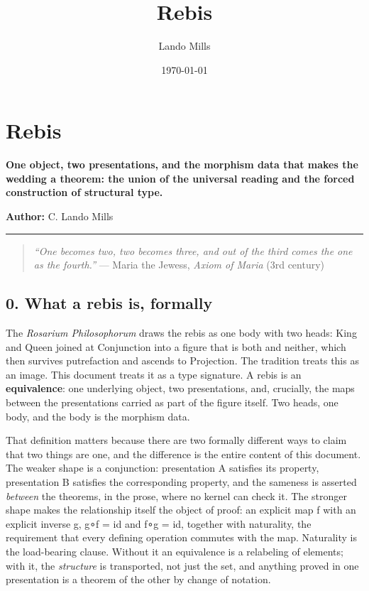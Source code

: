 \documentclass[12pt,a4paper]{article}
\title{Rebis}
\date{\today}
\author{Lando Mills}
\begin{document}
\maketitle
\hypertarget{rebis}{%
\section{Rebis}\label{rebis}}

\textbf{One object, two presentations, and the morphism data that makes
the wedding a theorem: the union of the universal reading and the forced
construction of structural type.}

\textbf{Author:} C. Lando Mills

\begin{center}\rule{0.5\linewidth}{0.5pt}\end{center}

\begin{quote}
\emph{``One becomes two, two becomes three, and out of the third comes
the one as the fourth.''} --- Maria the Jewess, \emph{Axiom of Maria}
(3rd century)
\end{quote}

\hypertarget{what-a-rebis-is-formally}{%
\subsection{0. What a rebis is,
formally}\label{what-a-rebis-is-formally}}

The \emph{Rosarium Philosophorum} draws the rebis as one body with two
heads: King and Queen joined at Conjunction into a figure that is both
and neither, which then survives putrefaction and ascends to Projection.
The tradition treats this as an image. This document treats it as a type
signature. A rebis is an \textbf{equivalence}: one underlying object,
two presentations, and, crucially, the maps between the presentations
carried as part of the figure itself. Two heads, one body, and the body
is the morphism data.

That definition matters because there are two formally different ways to
claim that two things are one, and the difference is the entire content
of this document. The weaker shape is a conjunction: presentation A
satisfies its property, presentation B satisfies the corresponding
property, and the sameness is asserted \emph{between} the theorems, in
the prose, where no kernel can check it. The stronger shape makes the
relationship itself the object of proof: an explicit map f with an
explicit inverse g, g∘f = id and f∘g = id, together with naturality, the
requirement that every defining operation commutes with the map.
Naturality is the load-bearing clause. Without it an equivalence is a
relabeling of elements; with it, the \emph{structure} is transported,
not just the set, and anything proved in one presentation is a theorem
of the other by change of notation.
\end{document}
